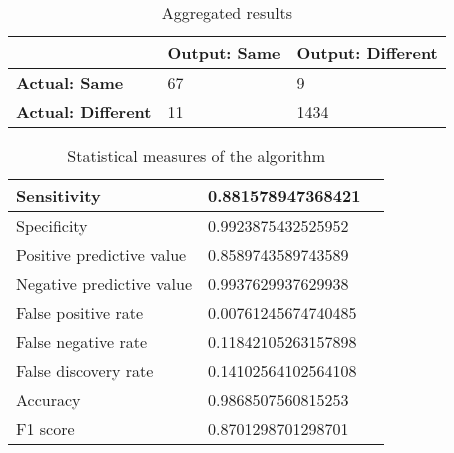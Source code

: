\begin{table}[H]
	\centering
    \begin{tabular}{|l|l|l|}
        \hline
        \cellcolor{gray} & \textbf{Output: Same} & \textbf{Output: Different} \\ [0.5ex]
        \hline\hline
        \textbf{Actual: Same} & 67 & 9 \\ [0.5ex]
        \hline
        \textbf{Actual: Different} & 11 & 1434 \\ [0.5ex]
        \hline
    \end{tabular}
    \caption{Aggregated results}
\end{table}


\begin{table}[H]
	\centering
    \begin{tabular}{|l|l|l|}
        \hline
        Sensitivity                 & 0.881578947368421 \\
        \hline
        Specificity                 & 0.9923875432525952 \\
        \hline
        Positive predictive value   & 0.8589743589743589 \\
        \hline
        Negative predictive value   & 0.9937629937629938 \\
        \hline
        False positive rate         & 0.00761245674740485 \\
        \hline
        False negative rate         & 0.11842105263157898 \\
        \hline
        False discovery rate        & 0.14102564102564108 \\
        \hline
        Accuracy                    & 0.9868507560815253 \\
        \hline
        F1 score                    & 0.8701298701298701 \\
        \hline
    \end{tabular}
    \caption{Statistical measures of the algorithm}
\end{table}

